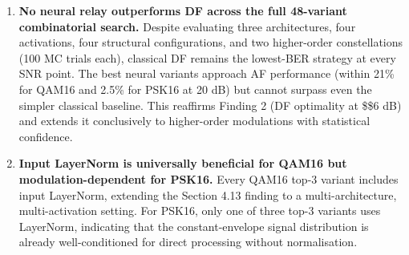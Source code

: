 \documentclass[
  english,
  12pt,
  12pt,
  a4paper,
  oneside]{report}
\begin{document}
\begin{enumerate}
  \textbf{Mamba S6 is the strongest architecture across the reported higher-order modulation experiments.} In the QAM16 top-3, Mamba S6 holds the \#1 position while the Transformer captures positions \#2 and \#3. In the PSK16 top-3, Mamba S6 sweeps all three positions. Within these experiments, the Mamba S6 architecture's selective state space mechanism appears well-suited to tracking both the multi-level amplitude structure of QAM and the rotational phase geometry of PSK.
\item
  \textbf{No neural relay outperforms DF across the full 48-variant combinatorial search.} Despite evaluating three architectures, four activations, four structural configurations, and two higher-order constellations (100 MC trials each), classical DF remains the lowest-BER strategy at every SNR point. The best neural variants approach AF performance (within 21\% for QAM16 and 2.5\% for PSK16 at 20 dB) but cannot surpass even the simpler classical baseline. This reaffirms Finding 2 (DF optimality at \$\geq\$6 dB) and extends it conclusively to higher-order modulations with statistical confidence.
\item
  \textbf{Input LayerNorm is universally beneficial for QAM16 but modulation-dependent for PSK16.} Every QAM16 top-3 variant includes input LayerNorm, extending the Section 4.13 finding to a multi-architecture, multi-activation setting. For PSK16, only one of three top-3 variants uses LayerNorm, indicating that the constant-envelope signal distribution is already well-conditioned for direct processing without normalisation.
\end{enumerate}
\end{document}
